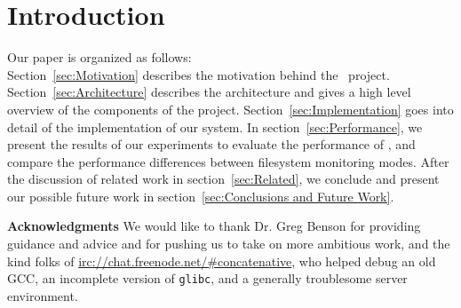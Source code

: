 \section{Introduction}
\label{sec:Introduction}


Our paper is organized as follows:\\
Section~\ref{sec:Motivation} describes the motivation behind the \teledroid\ project.
Section~\ref{sec:Architecture} describes the architecture and gives a high level overview of the components of the project.
Section~\ref{sec:Implementation} goes into detail of the implementation of our system.
In section~\ref{sec:Performance}, we present the results of our experiments to evaluate the performance of \teledroid, and compare the performance differences between filesystem monitoring modes.
After the discussion of related work in section~\ref{sec:Related}, we conclude and present our possible future work 
in section~\ref{sec:Conclusions and Future Work}.

{\bf Acknowledgments}  We would like to thank Dr. Greg Benson for providing guidance and advice and for pushing us to 
take on more ambitious work, and the kind folks of \url{irc://chat.freenode.net/#concatenative}, who helped debug an old 
GCC, an incomplete version of \verb+glibc+, and a generally troublesome server environment.